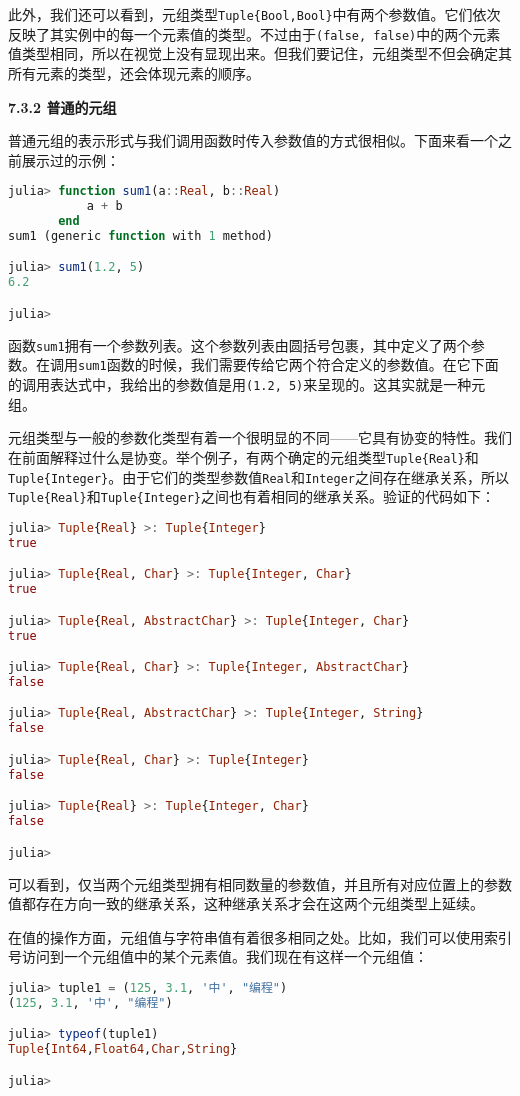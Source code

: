 此外，我们还可以看到，元组类型\verb|Tuple{Bool,Bool}|中有两个参数值。它们依次反映了其实例中的每一个元素值的类型。不过由于\verb|(false, false)|中的两个元素值类型相同，所以在视觉上没有显现出来。但我们要记住，元组类型不但会确定其所有元素的类型，还会体现元素的顺序。

\textbf{7.3.2 普通的元组}

普通元组的表示形式与我们调用函数时传入参数值的方式很相似。下面来看一个之前展示过的示例：
\begin{lstlisting}[language=julia]
julia> function sum1(a::Real, b::Real)
           a + b
       end
sum1 (generic function with 1 method)

julia> sum1(1.2, 5)
6.2

julia> 
\end{lstlisting}

函数\verb|sum1|拥有一个参数列表。这个参数列表由圆括号包裹，其中定义了两个参数。在调用\verb|sum1|函数的时候，我们需要传给它两个符合定义的参数值。在它下面的调用表达式中，我给出的参数值是用\verb|(1.2, 5)|来呈现的。这其实就是一种元组。

元组类型与一般的参数化类型有着一个很明显的不同——它具有协变的特性。我们在前面解释过什么是协变。举个例子，有两个确定的元组类型\verb|Tuple{Real}|和\verb|Tuple{Integer}|。由于它们的类型参数值\verb|Real|和\verb|Integer|之间存在继承关系，所以\verb|Tuple{Real}|和\verb|Tuple{Integer}|之间也有着相同的继承关系。验证的代码如下：
\begin{lstlisting}[language=julia]
julia> Tuple{Real} >: Tuple{Integer}
true

julia> Tuple{Real, Char} >: Tuple{Integer, Char}
true

julia> Tuple{Real, AbstractChar} >: Tuple{Integer, Char}
true

julia> Tuple{Real, Char} >: Tuple{Integer, AbstractChar}
false

julia> Tuple{Real, AbstractChar} >: Tuple{Integer, String}
false

julia> Tuple{Real, Char} >: Tuple{Integer}
false

julia> Tuple{Real} >: Tuple{Integer, Char}
false

julia> 
\end{lstlisting}

可以看到，仅当两个元组类型拥有相同数量的参数值，并且所有对应位置上的参数值都存在方向一致的继承关系，这种继承关系才会在这两个元组类型上延续。

在值的操作方面，元组值与字符串值有着很多相同之处。比如，我们可以使用索引号访问到一个元组值中的某个元素值。我们现在有这样一个元组值：
\begin{lstlisting}[language=julia]
julia> tuple1 = (125, 3.1, '中', "编程")
(125, 3.1, '中', "编程")

julia> typeof(tuple1)
Tuple{Int64,Float64,Char,String}

julia> 
\end{lstlisting}

